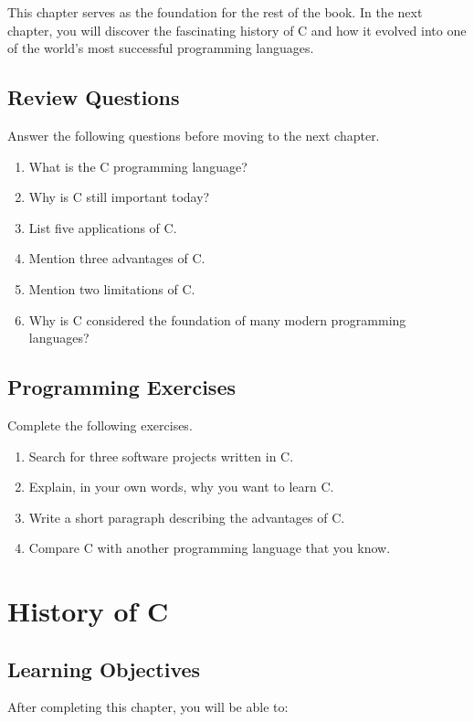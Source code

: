\documentclass[12pt,openany]{book}
\begin{document}
This chapter serves as the foundation for the rest of the book. In the next chapter, you will discover the fascinating history of C and how it evolved into one of the world's most successful programming languages.

\section{Review Questions}

Answer the following questions before moving to the next chapter.

\begin{enumerate}
    \item What is the C programming language?
    \item Why is C still important today?
    \item List five applications of C.
    \item Mention three advantages of C.
    \item Mention two limitations of C.
    \item Why is C considered the foundation of many modern programming languages?
\end{enumerate}

\section{Programming Exercises}

Complete the following exercises.

\begin{enumerate}
    \item Search for three software projects written in C.
    \item Explain, in your own words, why you want to learn C.
    \item Write a short paragraph describing the advantages of C.
    \item Compare C with another programming language that you know.
\end{enumerate}
\chapter{History of C}

\section{Learning Objectives}

After completing this chapter, you will be able to:
\end{document}
